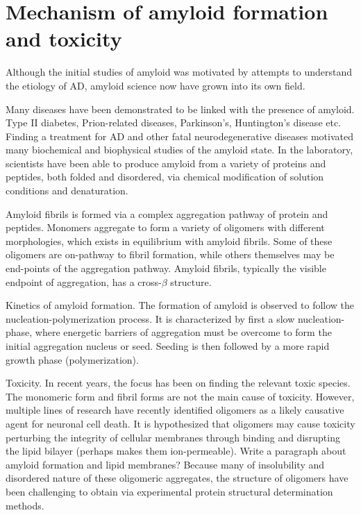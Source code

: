 \section{Mechanism of amyloid formation and toxicity}
\begin{outline}[enumerate]
\1 Although the initial studies of amyloid was motivated by attempts to understand the etiology of AD, amyloid science now have grown into its own field.

\1 Many diseases have been demonstrated to be linked with the presence of amyloid. Type II diabetes, Prion-related diseases, Parkinson's, Huntington's disease etc. Finding a treatment for AD and other fatal neurodegenerative diseases motivated many biochemical and biophysical studies of the amyloid state.  In the laboratory, scientists have been able to produce amyloid from a variety of proteins and peptides, both folded and disordered, via chemical modification of solution conditions and denaturation.

	\2 Amyloid fibrils is formed via a complex aggregation pathway of protein and peptides. Monomers aggregate to form a variety of oligomers with different morphologies, which exists in equilibrium with amyloid fibrils. Some of these oligomers are on-pathway to fibril formation, while others themselves may be end-points of the aggregation pathway. Amyloid fibrils, typically the visible endpoint of aggregation, has a cross-$\beta$ structure.

	\2 Kinetics of amyloid formation.  The formation of amyloid is observed to follow the nucleation-polymerization process. It is characterized by first a slow nucleation-phase, where energetic barriers of aggregation must be overcome to form the initial aggregation nucleus or seed.  Seeding is then followed by a more rapid growth phase (polymerization).

\1 Toxicity. In recent years, the focus has been on finding the relevant toxic species. The monomeric form and fibril forms are not the main cause of toxicity. However, multiple lines of research have recently identified oligomers as a likely causative agent for neuronal cell death.  It is hypothesized that oligomers may cause toxicity perturbing the integrity of cellular membranes through binding and disrupting the lipid bilayer (perhaps makes them ion-permeable).
  \2 Write a paragraph about amyloid formation and lipid membranes?
\1 Because many of insolubility and disordered nature of these oligomeric aggregates, the structure of oligomers have been challenging to obtain via experimental protein structural determination methods.
\end{outline}

